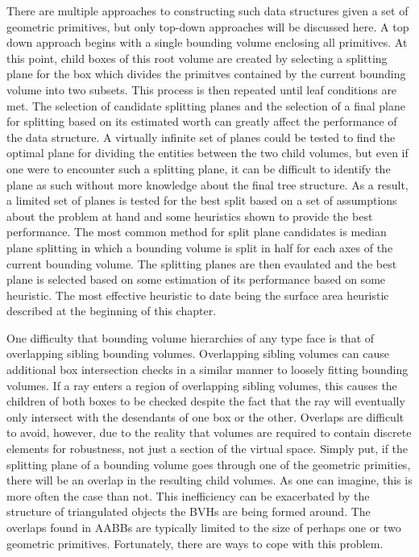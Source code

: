 \documentclass[12pt, a4paper]{article}
\begin{document}
There are multiple approaches to constructing such data structures given a set of geometric primitives, but only top-down approaches will be discussed here. A top down approach begins with a single bounding volume enclosing all primitives. At this point, child boxes of this root volume are created by selecting a splitting plane for the box which divides the primitves contained by the current bounding volume into two subsets. This process is then repeated until leaf conditions are met. The selection of candidate splitting planes and the selection of a final plane for splitting based on its estimated worth can greatly affect the performance of the data structure. A virtually infinite set of planes could be tested to find the optimal plane for dividing the entities between the two child volumes, but even if one were to encounter such a splitting plane, it can be difficult to identify the plane as such without more knowledge about the final tree structure. As a result, a limited set of planes is tested for the best split based on a set of assumptions about the problem at hand and some heuristics shown to provide the best performance. The most common method for split plane candidates is median plane splitting in which a bounding volume is split in half for each axes of the current bounding volume. The splitting planes are then evaulated and the best plane is selected based on some estimation of its performance based on some heuristic. The most effective heuristic to date being the surface area heuristic described at the beginning of this chapter.

One difficulty that bounding volume hierarchies of any type face is that of overlapping sibling bounding volumes. Overlapping sibling volumes can cause additional box intersection checks in a similar manner to loosely fitting bounding volumes. If a ray enters a region of overlapping sibling volumes, this causes the children of both boxes to be checked despite the fact that the ray will eventually only intersect with the desendants of one box or the other. Overlaps are difficult to avoid, however, due to the reality that volumes are required to contain discrete elements for robustness, not just a section of the virtual space. Simply put, if the splitting plane of a bounding volume goes through one of the geometric primities, there will be an overlap in the resulting child volumes. As one can imagine, this is more often the case than not. This inefficiency can be exacerbated by the structure of triangulated objects the BVHs are being formed around. The overlaps found in AABBs are typically limited to the size of perhaps one or two geometric primitives. Fortunately, there are ways to cope with this problem.
\end{document}
